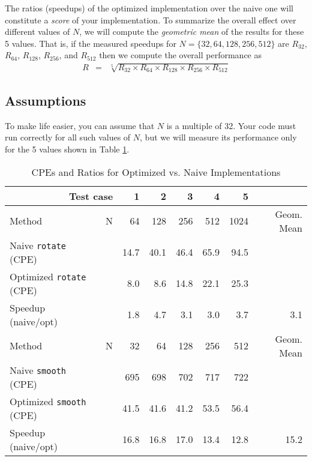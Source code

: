 \documentclass[11pt]{article}
\begin{document}
The ratios (speedups) of the optimized implementation over the naive
one will constitute a {\it score} of your implementation. 
To summarize the overall effect over different values of $N$,
we will compute the {\em geometric mean} of the
results for  these 5 values. That is, 
if the measured speedups for $N=\{32, 64, 128, 256, 512\}$ are
$R_{32}$, $R_{64}$, $R_{128}$, $ R_{256}$,  and $ R_{512}$  
then we compute the overall performance as
\begin{eqnarray*}
R & = & \sqrt[5]{R_{32} \times R_{64} \times R_{128} \times R_{256}  \times R_{512}}
\end{eqnarray*}

\subsection*{Assumptions}
To make life easier, you can assume that $N$ is a multiple
of 32.  Your code must run correctly for all such values of $N$, but
we will measure its performance only for the 5 values shown in Table
\ref{tbl:cpes}.


\begin{table}
\begin{center}
\begin{tabular}{|ll|rrrrr|r|}
\hline
\multicolumn{2}{|r|}{Test case}&1&2&3&4&5&\\
\hline
\hline
Method & N & 64 & 128 & 256 & 512 & 1024 & Geom. Mean \\
\hline
Naive {\tt rotate} (CPE)
&   & 14.7 &  40.1 &  46.4 &  65.9 &  94.5 & \\
\hline
Optimized {\tt rotate} (CPE)
&   & 8.0  & 8.6 &  14.8 &  22.1 &  25.3 & \\
\hline
Speedup (naive/opt)
&   &  1.8 &   4.7  & 3.1  &  3.0  &  3.7  &  3.1   \\
\hline
\hline
Method & N & 32 & 64 & 128 & 256 & 512 & Geom. Mean \\
\hline
Naive {\tt smooth} (CPE)
& & 695 & 698 & 702 & 717 & 722 & \\
\hline
Optimized {\tt smooth} (CPE)
& & 41.5 & 41.6 & 41.2 & 53.5 & 56.4 & \\
\hline
Speedup (naive/opt)
& & 16.8 &  16.8 & 17.0 & 13.4 & 12.8 & 15.2 \\
\hline
\end{tabular}
\end{center}
\caption{CPEs and Ratios for Optimized vs. Naive Implementations}
\label{tbl:cpes}
\end{table}
\end{document}
